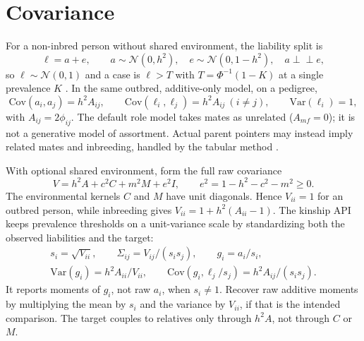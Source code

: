 \documentclass[11pt,a4paper]{article}
\newcommand{\Var}{\mathrm{Var}}
\newcommand{\Cov}{\mathrm{Cov}}
\newcommand{\h}{h^{2}}
\newcommand{\ind}{\perp\!\!\!\perp}
\begin{document}
\section{Covariance}
\label{sec:ltm}

For a non-inbred person without shared environment, the liability split is
\begin{equation}
  \ell = a + e,
  \qquad
  a\sim\mathcal{N}(0,\h),\quad
  e\sim\mathcal{N}(0,1-\h),\quad
  a\ind e,
\end{equation}
so $\ell\sim\mathcal{N}(0,1)$ and a case is $\ell>T$ with
$T=\Phi^{-1}(1-K)$ at a single prevalence $K$
\cite{wright1934,falconer1965}.
In the same outbred, additive-only model, on a pedigree,
\begin{equation}
  \Cov(a_i,a_j)=\h A_{ij},
  \qquad
  \Cov(\ell_i,\ell_j)=\h A_{ij}\ (i\neq j),
  \qquad
  \Var(\ell_i)=1,
  \label{eq:animal}
\end{equation}
with $A_{ij}=2\phi_{ij}$.
The default role model takes mates as unrelated ($A_{mf}=0$); it is not
a generative model of assortment. Actual parent pointers may instead
imply related mates and inbreeding, handled by the tabular method
\cite{henderson1976}.

With optional shared environment, form the full raw covariance
\begin{equation}
  V=\h A+c^{2}C+m^{2}M+e^{2}I,
  \qquad e^{2}=1-\h-c^{2}-m^{2}\ge0.
  \label{eq:ACE}
\end{equation}
The environmental kernels $C$ and $M$ have unit diagonals. Hence $V_{ii}=1$ for an
outbred person, while inbreeding gives $V_{ii}=1+\h(A_{ii}-1)$.
The kinship API keeps prevalence thresholds on a unit-variance scale
by standardizing both the observed liabilities and the target:
\begin{equation}
\begin{gathered}
  s_i=\sqrt{V_{ii}},\qquad \Sigma_{ij}=V_{ij}/(s_i s_j),\qquad g_i=a_i/s_i,\\
  \Var(g_i)=\h A_{ii}/V_{ii},\qquad
  \Cov(g_i,\ell_j/s_j)=\h A_{ij}/(s_i s_j).
\end{gathered}
\label{eq:scaled-target}
\end{equation}
It reports moments of $g_i$, not raw $a_i$, when $s_i\ne1$.
Recover raw additive moments by multiplying the mean by $s_i$ and the
variance by $V_{ii}$, if that is the intended comparison. The target
couples to relatives only through $\h A$, not through $C$ or $M$.
\end{document}
